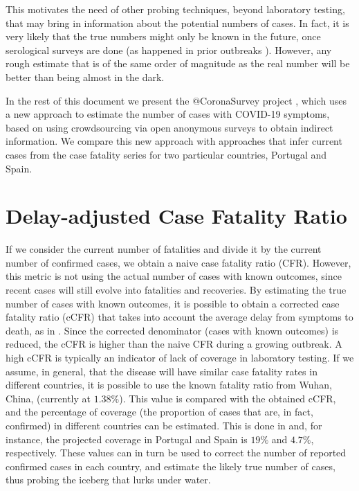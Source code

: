 \documentclass{article}
\begin{document}
This motivates the need of other probing techniques, beyond laboratory testing, that may bring in information about the potential numbers of cases. In fact, it is very likely that the true numbers might only be known in the future, once serological surveys are done (as happened in prior outbreaks \cite{yang2012serological}). However, any rough estimate that is of the same order of magnitude as the real number will be better than being almost in the dark.

In the rest of this document we present the $@$CoronaSurvey project \cite{CoronaSurveys}, which uses a new approach to estimate the number of cases with COVID-19 symptoms, based on using crowdsourcing via open anonymous surveys to obtain indirect information. We compare this new approach with approaches that infer current cases from the case fatality series for two particular countries, Portugal and Spain.

\section{Delay-adjusted Case Fatality Ratio}

If we consider the current number of fatalities and divide it by the current number of confirmed cases, we obtain a naive case fatality ratio (CFR). However, this metric is not using the actual number of cases with known outcomes, since recent cases will still evolve into fatalities and recoveries. By estimating the true number of cases with known outcomes, it is possible to obtain a corrected case fatality ratio (cCFR) that takes into account the average delay from symptoms to death, as in \cite{nishiura2009early}.
Since the corrected denominator (cases with known outcomes) is reduced, the cCFR is higher than the naive CFR during a growing outbreak. A high cCFR is typically an indicator of lack of coverage in laboratory testing. If we assume, in general, that the disease will have similar case fatality rates in different countries, it is possible to use the known fatality ratio from Wuhan, China, (currently at $1.38\%$). This value is compared with the obtained cCFR, and the percentage of coverage (the proportion of cases that are, in fact, confirmed) in different countries can be estimated. This is done in \cite{russel2020using} and, for instance, the projected coverage in Portugal and Spain is $19\%$ and $4.7\%$, respectively. These values can in turn be used to correct the number of reported confirmed cases in each country, and estimate the likely true number of cases, thus probing the iceberg that lurks under water.
\end{document}
